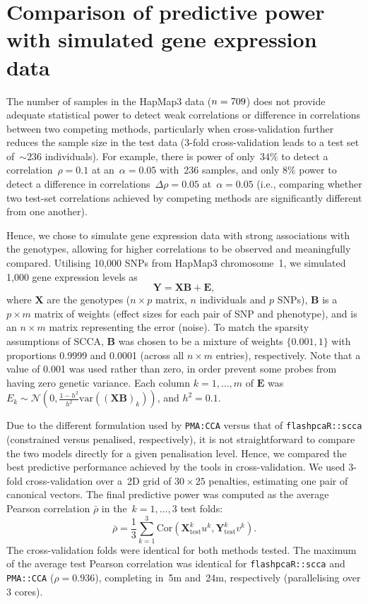 \documentclass[a4paper,10pt]{scrartcl}
\begin{document}
\section{Comparison of predictive power with simulated gene expression data}
\label{section:sim}

The number of samples in the HapMap3 data ($n=709$) does not provide
adequate statistical power to detect weak correlations or difference in
correlations between two competing methods, particularly when cross-validation
further reduces the sample size in the test data (3-fold cross-validation
leads to a test set of~${\sim}236$ individuals). For example, there is power
of only~$34\%$ to detect a correlation~$\rho=0.1$ at an~$\alpha=0.05$
with~236 samples, and only $8\%$ power to detect a difference in
correlations~$\Delta\rho=0.05$ at~$\alpha=0.05$ (i.e., comparing whether
two test-set correlations achieved by competing methods are significantly
different from one another).


Hence, we chose to simulate gene expression data with strong associations
with the genotypes, allowing for higher correlations to be observed and
meaningfully compared.  Utilising 10,000 SNPs from HapMap3 chromosome~1,
we simulated 1,000 gene expression levels as
$$
\mathbf{Y} = \mathbf{X} \mathbf{B} + \mathbf{E},
$$
where $\mathbf{X}$ are the genotypes ($n \times p$ matrix, $n$ individuals and
$p$ SNPs), $\mathbf{B}$ is a $p \times m$ matrix of weights (effect sizes for
each pair of SNP and phenotype), and is an $n \times m$ matrix representing
the error (noise). To match the sparsity assumptions of SCCA, $\mathbf{B}$
was chosen to be a mixture of weights $\{0.001, 1\}$ with proportions 0.9999
and 0.0001 (across all $n \times m$ entries), respectively.  Note that a value
of 0.001 was used rather than zero, in order prevent some probes from having
zero genetic variance. Each column $k=1,\hdots,m$ of $\mathbf{E}$ was $E_k
\sim \mathcal{N}(0, \frac{1-h^2}{h^2} \mbox{var}((\mathbf{X}\mathbf{B})_k))$,
and $h^2=0.1$.

Due to the different formulation used by \texttt{PMA:CCA} versus that of
\texttt{flashpcaR::scca} (constrained versus penalised, respectively),
it is not straightforward to compare the two models directly for a given
penalisation level. Hence, we compared the best predictive performance
achieved by the tools in cross-validation.  We used 3-fold cross-validation
over a~2D grid of $30\times25$ penalties, estimating one pair of canonical
vectors. The final predictive power was computed as the average Pearson
correlation $\bar{\rho}$ in the~$k=1,\hdots,3$ test folds:
$$
\bar{\rho} = \frac{1}{3} \sum_{k=1}^3
   \mbox{Cor}(\mathbf{X}_{\mbox{test}}^k u^k, \mathbf{Y}_{\mbox{test}}^k v^k).
$$
The cross-validation folds were identical for both methods tested.
The maximum of the average test Pearson correlation was identical for
\texttt{flashpcaR::scca} and \texttt{PMA::CCA} ($\rho{=}0.936$), completing
in~5m and~24m, respectively (parallelising over 3 cores).
\end{document}
